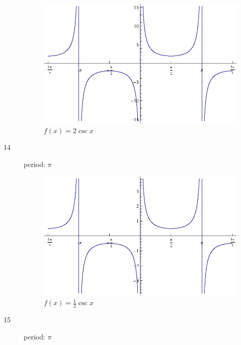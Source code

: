 \documentclass{exam}
\begin{document}
\begin{description}
        \begin{figure}[H]
          \centering
          \includegraphics[scale=0.8]{exercise13.eps}
          \caption{$f(x) = 2 \csc x$}
        \end{figure}

      \item[14]
        period: $\pi$

        \begin{figure}[H]
          \centering
          \includegraphics[scale=0.8]{exercise14.eps}
          \caption{$f(x) = \frac{1}{2} \csc x$}
        \end{figure}

      \item[15]
        period: $\pi$


\end{description}
\end{document}
